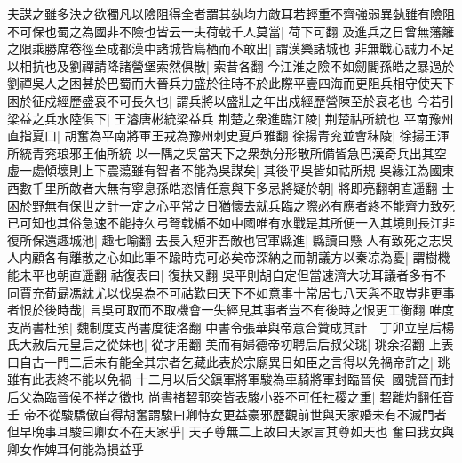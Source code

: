 夫謀之雖多決之欲獨凡以險阻得全者謂其埶均力敵耳若輕重不齊強弱異埶雖有險阻不可保也蜀之為國非不險也皆云一夫荷戟千人莫當|{
	荷下可翻}
及進兵之日曾無藩籬之限乘勝席卷徑至成都漢中諸城皆鳥栖而不敢出|{
	謂漢樂諸城也}
非無戰心誠力不足以相抗也及劉禪請降諸營堡索然俱散|{
	索昔各翻}
今江淮之險不如劒閣孫皓之暴過於劉禪吳人之困甚於巴蜀而大晉兵力盛於往時不於此際平壹四海而更阻兵相守使天下困於征戍經歷盛衰不可長久也|{
	謂兵將以盛壯之年出戍經歷營陳至於衰老也}
今若引梁益之兵水陸俱下|{
	王濬唐彬統梁益兵}
荆楚之衆進臨江陵|{
	荆楚祜所統也}
平南豫州直指夏口|{
	胡奮為平南將軍王戎為豫州刺史夏戶雅翻}
徐揚青兖並會秣陵|{
	徐揚王渾所統青兖琅邪王伷所統}
以一隅之吳當天下之衆埶分形散所備皆急巴漢奇兵出其空虚一處傾壞則上下震蕩雖有智者不能為吳謀矣|{
	其後平吳皆如祜所規}
吳緣江為國東西數千里所敵者大無有寧息孫皓恣情任意與下多忌將疑於朝|{
	將即亮翻朝直遥翻}
士困於野無有保世之計一定之心平常之日猶懷去就兵臨之際必有應者終不能齊力致死已可知也其俗急速不能持久弓弩戟楯不如中國唯有水戰是其所便一入其境則長江非復所保還趣城池|{
	趣七喻翻}
去長入短非吾敵也官軍縣進|{
	縣讀曰懸}
人有致死之志吳人内顧各有離散之心如此軍不踰時克可必矣帝深納之而朝議方以秦凉為憂|{
	謂樹機能未平也朝直遥翻}
祜復表曰|{
	復扶又翻}
吳平則胡自定但當速濟大功耳議者多有不同賈充荀朂馮紞尤以伐吳為不可祜歎曰天下不如意事十常居七八天與不取豈非更事者恨於後時哉|{
	言吳可取而不取機會一失經見其事者豈不有後時之恨更工衡翻}
唯度支尚書杜預|{
	魏制度支尚書度徒洛翻}
中書令張華與帝意合贊成其計　丁卯立皇后楊氏大赦后元皇后之從妹也|{
	從才用翻}
美而有婦德帝初聘后后叔父珧|{
	珧余招翻}
上表曰自古一門二后未有能全其宗者乞藏此表於宗廟異日如臣之言得以免禍帝許之|{
	珧雖有此表終不能以免禍}
十二月以后父鎮軍將軍駿為車騎將軍封臨晉侯|{
	國號晉而封后父為臨晉侯不祥之徵也}
尚書禇䂮郭奕皆表駿小器不可任社稷之重|{
	䂮離灼翻任音壬}
帝不從駿驕傲自得胡奮謂駿曰卿恃女更益豪邪歷觀前世與天家婚未有不滅門者但早晩事耳駿曰卿女不在天家乎|{
	天子尊無二上故曰天家言其尊如天也}
奮曰我女與卿女作婢耳何能為損益乎

